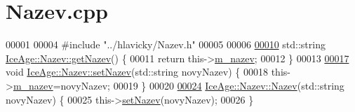 \hypertarget{Nazev_8cpp_source}{}\section{Nazev.\+cpp}
\label{Nazev_8cpp_source}

\begin{DoxyCode}
00001 
00004 \textcolor{preprocessor}{#include "../hlavicky/Nazev.h"}
00005 
00006 
\hypertarget{Nazev_8cpp_source.tex_l00010}{}\hyperlink{classIceAge_1_1Nazev_a09fcdd11a072b4a133cab63cdb4961a0}{00010} std::string \hyperlink{classIceAge_1_1Nazev_a09fcdd11a072b4a133cab63cdb4961a0}{IceAge::Nazev::getNazev}() \{
00011     \textcolor{keywordflow}{return} this->\hyperlink{classIceAge_1_1Nazev_a247a9f15b6c2f5ee361570530b75b8ce}{m\_nazev};
00012 \}
00013 
\hypertarget{Nazev_8cpp_source.tex_l00017}{}\hyperlink{classIceAge_1_1Nazev_ad5ad071231518f88e0699ac668d73b99}{00017} \textcolor{keywordtype}{void} \hyperlink{classIceAge_1_1Nazev_ad5ad071231518f88e0699ac668d73b99}{IceAge::Nazev::setNazev}(std::string novyNazev) \{
00018     this->\hyperlink{classIceAge_1_1Nazev_a247a9f15b6c2f5ee361570530b75b8ce}{m\_nazev}=novyNazev;
00019 \}
00020 
\hypertarget{Nazev_8cpp_source.tex_l00024}{}\hyperlink{classIceAge_1_1Nazev_a633e5ae710d8d9e8fcf043bcf9e3d6d0}{00024} \hyperlink{classIceAge_1_1Nazev_a633e5ae710d8d9e8fcf043bcf9e3d6d0}{IceAge::Nazev::Nazev}(std::string novyNazev) \{
00025     this->\hyperlink{classIceAge_1_1Nazev_ad5ad071231518f88e0699ac668d73b99}{setNazev}(novyNazev);
00026 \}
\end{DoxyCode}
